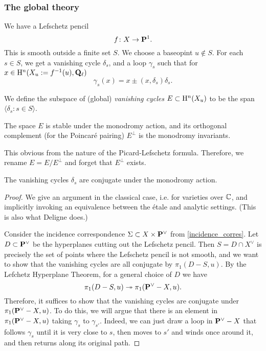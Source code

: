 \subsubsection{The global theory}
We have a Lefschetz pencil 
\[
f \colon X \rightarrow \mathbf{P}^1.
\]
This is smooth outside a finite set $S$. We choose a baseopint $u \notin S$. For each $s \in S$, we get a vanishing cycle $\delta_s$, and a loop $\gamma_s$ such that for $x \in \mathrm{H}^n(X_u := f^{-1}(u), \mathbf{Q}_{\ell})$ 
\[
\gamma_s(x) = x \pm (x, \delta_s) \delta_s.
\]

\begin{defn}
We define the subspace of (global) \emph{vanishing cycles} $E \subset \mathrm{H}^n(X_u)$ to be the span $\langle \delta_s \colon s \in S\rangle$. 
\end{defn}


\begin{prop}
The space $E$ is stable under the monodromy action, and its orthogonal complement (for the Poincar\'{e} pairing) $E^{\perp}$ is the monodromy invariants. 
\end{prop}

This obvious from the nature of the Picard-Lefschetz formula. Therefore, we rename $E = E/E^{\perp}$  and forget that $E^{\perp}$ exists. 

\begin{thm}
The vanishing cycles $\delta_s$ are conjugate under the monodromy action. 
\end{thm}

\begin{proof}
We give an argument in the classical case, i.e. for varieties over $\mathbb{C}$, and implicitly invoking an equivalence between the \'{e}tale and analytic settings. (This is also what Deligne does.) 

Consider the incidence correspondence $\Sigma \subset X \times \mathbf{P}^{\vee}$ from \eqref{incidence_corres}. Let $D \subset \mathbf{P}^{\vee}$ be the hyperplanes cutting out the Lefschetz pencil. Then $S = D \cap X^{\vee}$ is precisely the set of points where the Lefschetz pencil is not smooth, and we want to show that the vanishing cycles are all conjugate by $\pi_1(D-S, u)$. By the Lefchetz Hyperplane Theorem, for a general choice of $D$ we have 
\[
\pi_1(D-S, u) \twoheadrightarrow \pi_1(\mathbf{P}^{\vee}-X, u).
\]
Therefore, it suffices to show that the vanishing cycles are conjugate under $\pi_1(\mathbf{P}^{\vee}-X, u)$. To do this, we will argue that there is an element in $\pi_1(\mathbf{P}^{\vee}-X, u)$ taking $\gamma_s$ to $\gamma_{s'}$. Indeed, we can just draw a loop in $\mathbf{P}^{\vee}-X$ that follows $\gamma_s$ until it is very close to $s$, then moves to $s'$ and winds once around it, and then returns along its original path. 
\end{proof}

